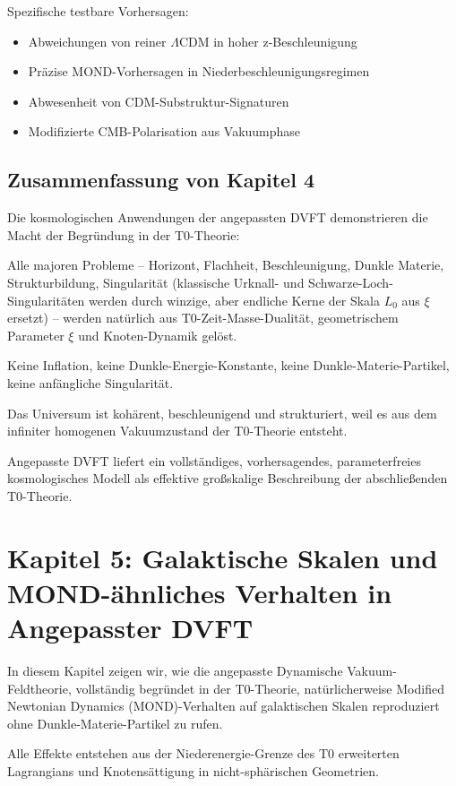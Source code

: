 	Spezifische testbare Vorhersagen:
	\begin{itemize}
		\item Abweichungen von reiner $\Lambda$CDM in hoher z-Beschleunigung
		\item Präzise MOND-Vorhersagen in Niederbeschleunigungsregimen
		\item Abwesenheit von CDM-Substruktur-Signaturen
		\item Modifizierte CMB-Polarisation aus Vakuumphase
	\end{itemize}
	
	\subsection{Zusammenfassung von Kapitel 4}
	
	Die kosmologischen Anwendungen der angepassten DVFT demonstrieren die Macht der Begründung in der T0-Theorie:
	
	Alle majoren Probleme – Horizont, Flachheit, Beschleunigung, Dunkle Materie, Strukturbildung, Singularität (klassische Urknall- und Schwarze-Loch-Singularitäten werden durch winzige, aber endliche Kerne der Skala $L_0$ aus $\xi$ ersetzt) – werden natürlich aus T0-Zeit-Masse-Dualität, geometrischem Parameter $\xi$ und Knoten-Dynamik gelöst.
	
	Keine Inflation, keine Dunkle-Energie-Konstante, keine Dunkle-Materie-Partikel, keine anfängliche Singularität.
	
	Das Universum ist kohärent, beschleunigend und strukturiert, weil es aus dem infiniter homogenen Vakuumzustand der T0-Theorie entsteht.
	
	Angepasste DVFT liefert ein vollständiges, vorhersagendes, parameterfreies kosmologisches Modell als effektive großskalige Beschreibung der abschließenden T0-Theorie.
	
	\section{Kapitel 5: Galaktische Skalen und MOND-ähnliches Verhalten in Angepasster DVFT}
	
	In diesem Kapitel zeigen wir, wie die angepasste Dynamische Vakuum-Feldtheorie, vollständig begründet in der T0-Theorie, natürlicherweise Modified Newtonian Dynamics (MOND)-Verhalten auf galaktischen Skalen reproduziert ohne Dunkle-Materie-Partikel zu rufen.
	
	Alle Effekte entstehen aus der Niederenergie-Grenze des T0 erweiterten Lagrangians und Knotensättigung in nicht-sphärischen Geometrien.
	
